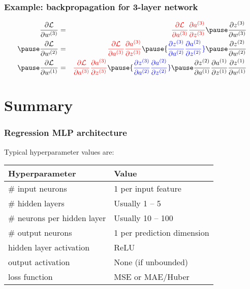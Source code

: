\documentclass[smaller]{beamer}
\begin{document}
\begin{frame}
  \frametitle{Example: backpropagation for 3-layer network}
  \pause
{}
\pause
\vspace{-2ex}
\begin{eqnarray}
 \pd{\mc{L}}{w^{(3)}} &=&  {\rd \pd{\mc{L}}{a^{(3)}}\pd{a^{(3)}}{z^{(3)}}}\pause \pd{z^{(3)}}{w^{(3)}}\\\pause
\pd{\mc{L}}{w^{(2)}} &=&  {\rd \pd{\mc{L}}{a^{(3)}}\pd{a^{(3)}}{z^{(3)}}} \pause {\bl \pd{z^{(3)}}{a^{(2)}}\pd{a^{(2)}}{z^{(2)}}} \pause                   
                    \pd{z^{(2)}}{w^{(2)}}\\\pause  
\pd{\mc{L}}{w^{(1)}} &=&  {\rd \pd{\mc{L}}{a^{(3)}}\pd{a^{(3)}}{z^{(3)}}} \pause {\bl \pd{z^{(3)}}{a^{(2)}}\pd{a^{(2)}}{z^{(2)}}} \pause                   
                    \pd{z^{(2)}}{a^{(1)}}                          
                    \pd{a^{(1)}}{z^{(1)}}\pd{z^{(1)}}{w^{(1)}}
\end{eqnarray}
\end{frame}




\section{Summary}

\begin{frame}
  \frametitle{Regression MLP architecture}
  \pause
  Typical hyperparameter values are: \pause

  \begin{table}\centering
  \begin{tabular}[t]{l l}
    \bf Hyperparameter & \bf Value \\\midrule
    \# input neurons & 1 per input feature \\[2mm]\pause
    \# hidden layers & Usually 1 -- 5 \\[2mm]\pause
    \# neurons per hidden layer & Usually 10 -- 100 \\[2mm]\pause
    \# output neurons & 1 per prediction dimension \\[2mm]\pause
    hidden layer activation & ReLU \\[2mm]\pause
    output activation & None (if unbounded) \\[2mm]\pause
    loss function & MSE or MAE/Huber
  \end{tabular}
\end{table}
\end{frame}
\end{document}
